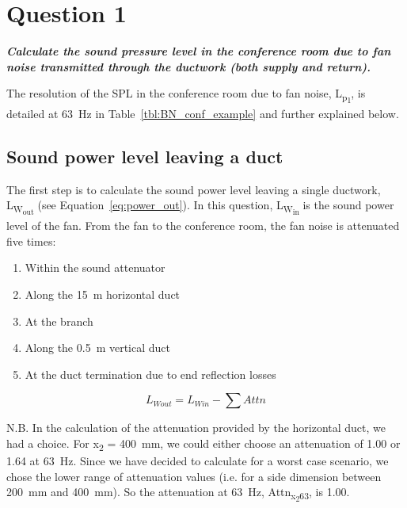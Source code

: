 \section{Question 1}

\textbf{\textit{Calculate the sound pressure level in the conference room due to fan noise transmitted through the ductwork (both supply and return).}}


The resolution of the SPL in the conference room due to fan noise, L\textsubscript{p\textsubscript{1}}, is detailed at 63~Hz in Table~\ref{tbl:BN_conf_example} and further explained below.


\subsection{Sound power level leaving a duct}

The first step is to calculate the sound power level leaving a single ductwork, L\textsubscript{W\textsubscript{out}} (see Equation~\ref{eq:power_out}).
In this question, L\textsubscript{W\textsubscript{in}} is the sound power level of the fan.
From the fan to the conference room, the fan noise is attenuated five times:
\begin{enumerate}
	\item Within the sound attenuator
	\item Along the 15~m horizontal duct
	\item At the branch
	\item Along the 0.5~m vertical duct
	\item At the duct termination due to end reflection losses
\end{enumerate}

    \begin{equation}\label{eq:power_out}
		L_{W out} = L_{W in} - \sum Attn
	\end{equation}

N.B. In the calculation of the attenuation provided by the horizontal duct, we had a choice.
For x\textsubscript{2} = 400~mm, we could either choose an attenuation of 1.00 or 1.64 at 63~Hz.
Since we have decided to calculate for a worst case scenario, we chose the lower range of attenuation values (i.e. for a side dimension between 200~mm and 400~mm).
So the attenuation at 63~Hz, Attn\textsubscript{x\textsubscript{2}63}, is 1.00.


